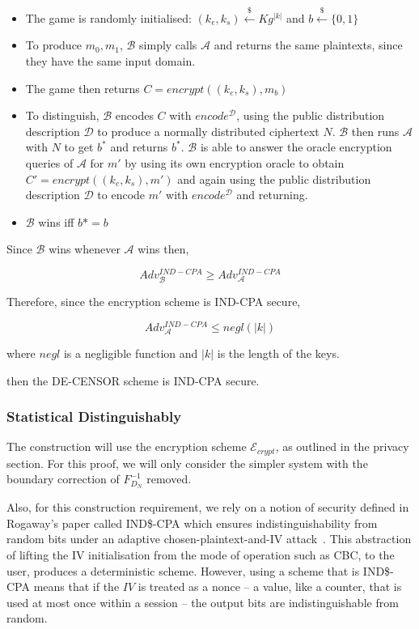 \documentclass[ %
                    author={Samuel Russell},
                supervisor={Prof. Bogdan Warinschi},
                    degree={MEng},
                     title={Innocuous Ciphertexts},
                  subtitle={The DE-CENSOR Scheme},
                      type={Research},
                      year={2018} ]{dissertation}
\begin{document}
\begin{itemize}


\item The game is randomly initialised: $(k_e, k_s) \xleftarrow{\$} Kg^{|k|}$ and $b \xleftarrow{\$} \{0,1\}$

\item To produce $m_0, m_1$, $\mathcal{B}$ simply calls  $\mathcal{A}$ and returns the same plaintexts, since they have the same input domain.

\item The game then returns $C = encrypt((k_e, k_s), m_b)$

\item To distinguish, $\mathcal{B}$ encodes $C$ with $encode^\mathcal{D}$, using the public distribution description $\mathcal{D}$ to produce a normally distributed ciphertext $N$. $\mathcal{B}$ then runs $\mathcal{A}$ with $N$ to get $b^*$ and returns $b^*$. $\mathcal{B}$ is able to answer the oracle encryption queries of $\mathcal{A}$ for $m'$ by using its own encryption oracle to obtain $C' = encrypt( (k_e, k_s), m')$ and again using the public distribution description $\mathcal{D}$ to encode $m'$ with $encode^\mathcal{D}$ and returning.

\item $\mathcal{B}$ wins iff $b* = b$

\end{itemize}

Since $\mathcal{B}$ wins whenever $\mathcal{A}$ wins then,

$$Adv_\mathcal{B}^{IND-CPA} \geq Adv_\mathcal{A}^{IND-CPA}$$

Therefore, since the encryption scheme is IND-CPA secure,

$$Adv_\mathcal{A}^{IND-CPA} \leq negl(|k|)$$

where $negl$ is a negligible function and $|k|$ is the length of the keys.

then the DE-CENSOR scheme is IND-CPA secure.

\subsubsection{Statistical Distinguishably}


The construction will use the encryption scheme $\mathcal{E}_{crypt}$, as outlined in the privacy section.
For this proof, we will only consider the simpler system with the boundary correction of $F^{-1}_{D_N}$ removed.

Also, for this construction requirement, we rely on a notion of security defined in Rogaway's paper called IND\$-CPA which ensures indistinguishability from random bits under an adaptive chosen-plaintext-and-IV attack~\cite{ind_dollar}.
This abstraction of lifting the IV initialisation from the mode of operation such as CBC, to the user, produces a deterministic scheme.
However, using a scheme that is IND\$-CPA means that if the $IV$ is treated as a nonce -- a value, like a counter, that is used at most once within a session -- the output bits are indistinguishable from random.
\end{document}
